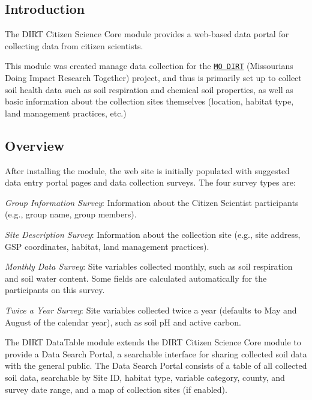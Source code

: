 \subsection*{Introduction}

The D\+I\+RT Citizen Science Core module provides a web-\/based data portal for collecting data from citizen scientists.

This module was created manage data collection for the \href{https://modirt.missouriepscor.org/}{\tt MO D\+I\+RT} (Missourians Doing Impact Research Together) project, and thus is primarily set up to collect soil health data such as soil respiration and chemical soil properties, as well as basic information about the collection sites themselves (location, habitat type, land management practices, etc.)

\subsection*{Overview}

After installing the module, the web site is initially populated with suggested data entry portal pages and data collection surveys. The four survey types are\+:


\begin{DoxyItemize}
\item {\itshape Group Information Survey}\+: Information about the Citizen Scientist participants (e.\+g., group name, group members).
\item {\itshape Site Description Survey}\+: Information about the collection site (e.\+g., site address, G\+SP coordinates, habitat, land management practices).
\item {\itshape Monthly Data Survey}\+: Site variables collected monthly, such as soil respiration and soil water content. Some fields are calculated automatically for the participants on this survey.
\item {\itshape Twice a Year Survey}\+: Site variables collected twice a year (defaults to May and August of the calendar year), such as soil pH and active carbon.
\end{DoxyItemize}

The D\+I\+RT Data\+Table module extends the D\+I\+RT Citizen Science Core module to provide a Data Search Portal, a searchable interface for sharing collected soil data with the general public. The Data Search Portal consists of a table of all collected soil data, searchable by Site ID, habitat type, variable category, county, and survey date range, and a map of collection sites (if enabled).

